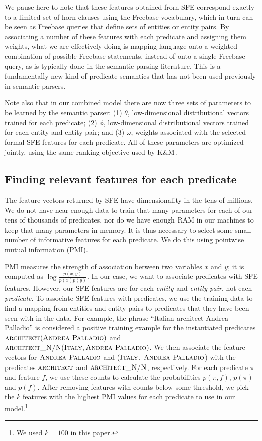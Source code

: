 \documentclass[11pt]{article}
\newcommand{\predicate}[1]{\ensuremath{\textsc{#1}}}
\newcommand{\entity}[1]{\ensuremath{\textsc{#1}}}
\begin{document}
We pause here to note that these features obtained from SFE correspond exactly
to a limited set of horn clauses using the Freebase vocabulary, which in turn
can be seen as Freebase queries that define sets of entities or entity pairs.
By associating a number of these features with each predicate and assigning
them weights, what we are effectively doing is mapping language onto a weighted
combination of possible Freebase statements, instead of onto a single Freebase
query, as is typically done in the semantic parsing literature.  This is a
fundamentally new kind of predicate semantics that has not been used previously
in semantic parsers.

Note also that in our combined model there are now three sets of parameters to
be learned by the semantic parser: (1) $\theta$, low-dimensional distributional
vectors trained for each predicate; (2) $\phi$, low-dimensional distributional
vectors trained for each entity and entity pair; and (3) $\omega$, weights
associated with the selected formal SFE features for each predicate.  All of
these parameters are optimized jointly, using the same ranking objective used
by K\&M.

\subsection{Finding relevant features for each predicate}
\label{sec:computing-pmi}

The feature vectors returned by SFE have dimensionality in the tens of
millions.  We do not have near enough data to train that many parameters for
each of our tens of thousands of predicates, nor do we have enough RAM in our
machines to keep that many parameters in memory.  It is thus necessary to
select some small number of informative features for each predicate.  We do
this using pointwise mutual information (PMI).

PMI measures the strength of association between two variables $x$ and $y$; it
is computed as $\log\frac{p(x,y)}{p(x)p(y)}$.  In our case, we want to
associate predicates with SFE features.  However, our SFE features are for each
\emph{entity} and \emph{entity pair}, not each \emph{predicate}.  To associate
SFE features with predicates, we use the training data to find a mapping from
entities and entity pairs to predicates that they have been seen with in the
data.  For example, the phrase ``Italian architect Andrea Palladio'' is
considered a positive training example for the instantiated predicates
$\predicate{architect}(\entity{Andrea Palladio})$ and
$\predicate{architect\_N/N}(\entity{Italy}, \entity{Andrea Palladio})$.  We
then associate the feature vectors for \entity{Andrea Palladio} and
(\entity{Italy}, \entity{Andrea Palladio}) with the predicates
\predicate{architect} and \predicate{architect\_N/N}, respectively.  For each
predicate $\pi$ and feature $f$, we use these counts to calculate the
probabilities $p(\pi, f)$, $p(\pi)$ and $p(f)$.  After removing features with
counts below some threshold, we pick the $k$ features with the highest PMI
values for each predicate to use in our model.\footnote{We used $k=100$ in this
paper.}
\end{document}
